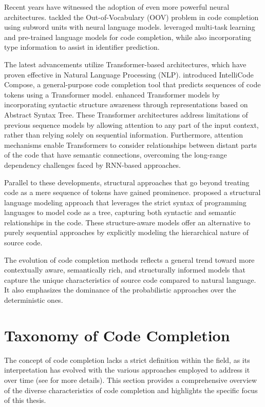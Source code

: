 Recent years have witnessed the adoption of even more powerful neural architectures. \citet{karampatsis2019} tackled the Out-of-Vocabulary (OOV) problem in code completion using subword units with neural language models. \citet{liu2020} leveraged multi-task learning and pre-trained language models for code completion, while also incorporating type information to assist in identifier prediction.

The latest advancements utilize Transformer-based architectures, which have proven effective in Natural Language Processing (NLP). \citet{svyatkovskiy2020} introduced IntelliCode Compose, a general-purpose code completion tool that predicts sequences of code tokens using a Transformer model. \citet{kim2021} enhanced Transformer models by incorporating syntactic structure awareness through representations based on Abstract Syntax Tree. These Transformer architectures address limitations of previous sequence models by allowing attention to any part of the input context, rather than relying solely on sequential information. Furthermore, attention mechanisms enable Transformers to consider relationships between distant parts of the code that have semantic connections, overcoming the long-range dependency challenges faced by RNN-based approaches.

Parallel to these developments, structural approaches that go beyond treating code as a mere sequence of tokens have gained prominence. \citet{alon2019} proposed a structural language modeling approach that leverages the strict syntax of programming languages to model code as a tree, capturing both syntactic and semantic relationships in the code. These structure-aware models offer an alternative to purely sequential approaches by explicitly modeling the hierarchical nature of source code.

The evolution of code completion methods reflects a general trend toward more contextually aware, semantically rich, and structurally informed models that capture the unique characteristics of source code compared to natural language. It also emphasizes the dominance of the probabilistic approaches over the deterministic ones.

\section{Taxonomy of Code Completion}

The concept of code completion lacks a strict definition within the field, as its interpretation has evolved with the various approaches employed to address it over time (see  for more details). This section provides a comprehensive overview of the diverse characteristics of code completion and highlights the specific focus of this thesis.

